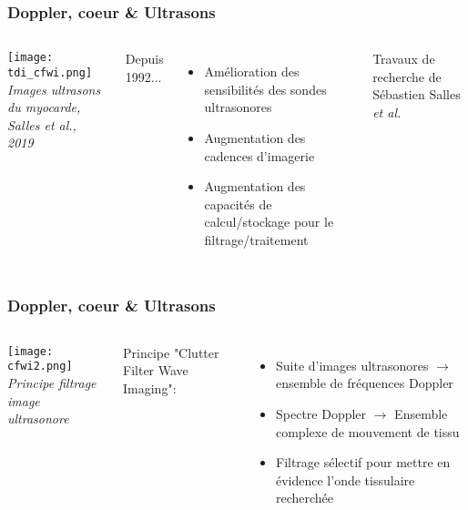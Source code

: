 \documentclass{beamer}
\begin{document}
\begin{frame}
\frametitle{Doppler, coeur \& Ultrasons}
\begin{columns}
\column{60mm}
\begin{center}
\texttt{[image: tdi\_cfwi.png]}\\
\textit{\footnotesize Images ultrasons du myocarde, Salles et al., 2019}
\end{center}
\column{60mm}
Depuis 1992... \\
\vspace{0.5cm}
\begin{itemize}
\item Amélioration des sensibilités des sondes ultrasonores
\vspace{0.5cm}
\item Augmentation des cadences d'imagerie
\vspace{0.5cm}
\item Augmentation des capacités de calcul/stockage pour le filtrage/traitement
\vspace{0.5cm}

\end{itemize}
Travaux de recherche de Sébastien Salles \textit{et al.}
\end{columns}
\end{frame}

\begin{frame}
\frametitle{Doppler, coeur \& Ultrasons}
\begin{columns}
\column{60mm}
\begin{center}
\texttt{[image: cfwi2.png]}\\
\textit{\footnotesize Principe filtrage image ultrasonore}
\end{center}
\column{60mm}
Principe "Clutter Filter Wave Imaging": \\
\vspace{0.5cm}
\begin{itemize}
\item Suite d'images ultrasonores $\rightarrow$ ensemble de fréquences Doppler
\vspace{0.5cm}
\item Spectre Doppler $\rightarrow$ Ensemble complexe de mouvement de tissu
\vspace{0.5cm}
\item Filtrage sélectif pour mettre en évidence l'onde tissulaire recherchée
\vspace{0.5cm}

\end{itemize}

\end{columns}
\end{frame}
\end{document}
